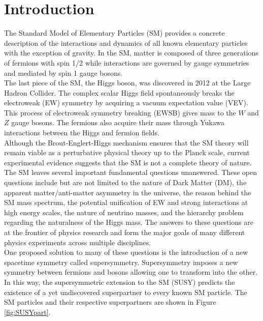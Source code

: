 \chapter{Introduction}
\label{introduction}

\indent The Standard Model of Elementary Particles (SM) provides a concrete description of the interactions and dynamics of all known elementary particles with the exception of gravity.\cite{peskinQFT,donoghue_golowich_holstein_1992}  In the SM, matter is composed of three generations of fermions with spin 1/2 while interactions are governed by gauge symmetries and mediated by spin 1 gauge bosons.  \\

\indent The last piece of the SM, the Higgs boson, was discovered in 2012 at the Large Hadron Collider.\cite{HiggsATLAS,HiggsCMS}  The complex scalar Higgs field spontaneously breaks the electroweak (EW) symmetry by acquiring a vacuum expectation value (VEV).\cite{EWSB,Higgs1,Higgs2,Higgs3} This process of electroweak symmetry breaking (EWSB) gives mass to the $W$ and $Z$ gauge bosons. The fermions also acquire their mass through Yukawa interactions between the Higgs and fermion fields. \\

\indent Although the Brout-Englert-Higgs mechanism\cite{Higgs1,Higgs2,Higgs3} ensures that the SM theory will remain viable as a perturbative physical theory up to the Planck scale, current experimental evidence suggests that the SM is not a complete theory of nature. The SM leaves several important fundamental questions unanswered.  These open questions include but are not limited to the nature of Dark Matter (DM), the apparent matter/anti-matter asymmetry in the universe,  the reason behind the SM mass spectrum, the potential unification of EW and strong interactions at high energy scales, the nature of neutrino masses, and the hierarchy problem regarding the naturalness of the Higgs mass.  The answers to these questions are at the frontier of physics research and form the major goals of many different physics experiments across multiple disciplines. \\

\indent One proposed solution to many of these questions is the introduction of a new spacetime symmetry called supersymmetry.\cite{MartinSUSY}  Supersymmetry imposes a new symmetry between fermions and bosons allowing one to transform into the other.  In this way, the supersymmetric extension to the SM (SUSY) predicts the existence of a yet undiscovered superpartner to every known SM particle.  The SM particles and their respective superpartners are shown in Figure \ref{fig:SUSYpart}. \\

